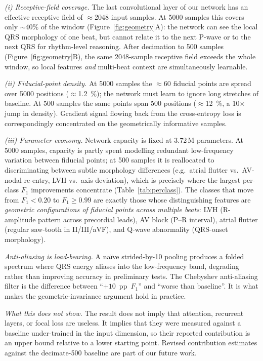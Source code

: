 \documentclass[conference]{IEEEtran}
\begin{document}
\emph{(i) Receptive-field coverage.} The last convolutional layer of our
network has an effective receptive field of $\approx$\num{2048} input
samples. At \num{5000} samples this covers only $\sim$40\% of the
window (Figure~\ref{fig:geometry}A): the network can see the local QRS
morphology of one beat, but cannot relate it to the next P-wave or to
the next QRS for rhythm-level reasoning. After decimation to \num{500}
samples (Figure~\ref{fig:geometry}B), the same \num{2048}-sample
receptive field exceeds the whole window, so local features
\emph{and} multi-beat context are simultaneously learnable.

\emph{(ii) Fiducial-point density.} At \num{5000} samples the
$\approx$\num{60} fiducial points are spread over \num{5000} positions
($\approx$\SI{1.2}{\percent}); the network must learn to ignore long
stretches of baseline. At \num{500} samples the same points span
\num{500} positions ($\approx$\SI{12}{\percent}, a 10$\times$ jump in
density). Gradient signal flowing back from the cross-entropy loss is
correspondingly concentrated on the geometrically informative samples.

\emph{(iii) Parameter economy.} Network capacity is fixed at
\num{3.72}\,M parameters. At \num{5000} samples, capacity is partly spent
modelling redundant low-frequency variation between fiducial points; at
\num{500} samples it is reallocated to discriminating between subtle
morphology differences (e.g.\ atrial flutter vs.\ AV-nodal re-entry,
LVH vs.\ axis deviation), which is precisely where the largest per-class
$F_1$ improvements concentrate (Table~\ref{tab:perclass}). The classes
that move from $F_1<0.20$ to $F_1\geq 0.99$ are exactly those whose
distinguishing features are \emph{geometric configurations of fiducial
points across multiple beats}: LVH (R-amplitude pattern across precordial
leads), AV block (P--R interval), atrial flutter (regular saw-tooth in
II/III/aVF), and Q-wave abnormality (QRS-onset morphology).

\emph{Anti-aliasing is load-bearing.} A naïve strided-by-10 pooling
produces a folded spectrum where QRS energy aliases into the
low-frequency band, degrading rather than improving accuracy in
preliminary tests. The Chebyshev anti-aliasing filter is the difference
between ``$+10$~pp~$F_1$'' and ``worse than baseline''. It is what makes
the geometric-invariance argument hold in practice.

\emph{What this does not show.} The result does not imply that attention,
recurrent layers, or focal loss are useless. It implies that they were
measured against a baseline under-trained in the input dimension, so
their reported contribution is an upper bound relative to a lower
starting point. Revised contribution estimates against the
decimate-500 baseline are part of our future work.
\end{document}
